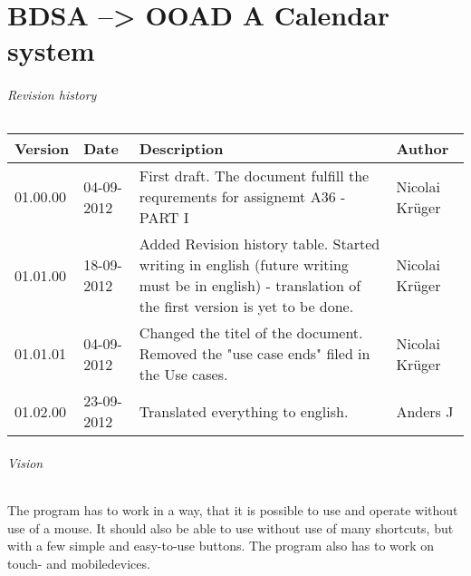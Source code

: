 \documentclass{article}
\begin{document}
  
  \part*{BDSA --> OOAD \linebreak A Calendar system}
  
  \paragraph{Revision history} \mbox{}  
  
  \begin{table}[ht]
    \begin{tabular}{|p{35pt}|p{50pt}|p{150pt}|p{75pt}|}
        \hline
        Version & Date &
        Description & 
        Author         
        \\ \hline
        01.00.00 & 04-09-2012 & 
        First draft. The document fulfill the requrements for assignemt A36 - PART I &
        Nicolai Krüger 
        \\ \hline        
        01.01.00 & 18-09-2012 & 
        Added Revision history table. Started writing in english (future writing must be in english) - translation of the first version is yet to be done. & 
        Nicolai Krüger              
        \\ \hline
        01.01.01 & 04-09-2012 &
        Changed the titel of the document. \linebreak
        Removed the "use case ends" filed in the Use cases. &
        Nicolai Krüger
        \\ \hline
        01.02.00 & 23-09-2012 & 
        Translated everything to english. &
        Anders J
        \\ \hline
    \end{tabular}
\end{table}
  
  \paragraph{Vision} \mbox{} 
  
  The program has to work in a way, that it is possible to use and operate without use of a mouse. It should also be able to use without use of many shortcuts, but with a few simple and easy-to-use buttons. 
  The program also has to work on touch- and mobiledevices. 
  
\end{document}
